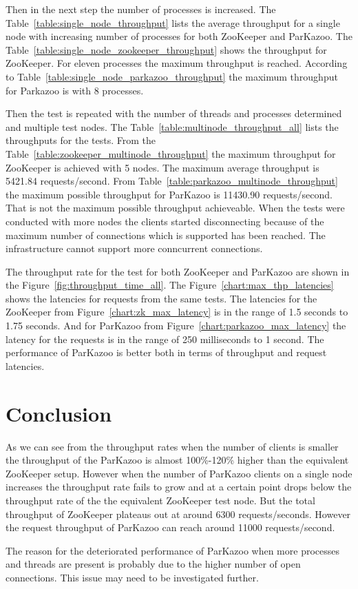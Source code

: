 

Then in the next step the number of processes is increased. The Table~\ref{table:single_node_throughput} lists the average throughput for a single node with increasing number of processes for both ZooKeeper and ParKazoo. The Table~\ref{table:single_node_zookeeper_throughput} shows the throughput for ZooKeeper. For eleven processes the maximum throughput is reached. According to Table~\ref{table:single_node_parkazoo_throughput} the maximum throughput for Parkazoo is with 8 processes.

Then the test is repeated with the number of threads and processes determined and multiple test nodes. The Table~\ref{table:multinode_throughput_all} lists the throughputs for the tests. From the Table~\ref{table:zookeeper_multinode_throughput} the maximum throughput for ZooKeeper is achieved with 5 nodes. The maximum average throughput is 5421.84 requests/second. From Table~\ref{table:parkazoo_multinode_throughput} the maximum possible throughput for ParKazoo is 11430.90 requests/second. That is not the maximum possible throughput achieveable. When the tests were conducted with more nodes the clients started disconnecting because of the maximum number of connections which is supported has been reached. The infrastructure cannot support more conncurrent connections.



The throughput rate for the test for both ZooKeeper and ParKazoo are shown in the Figure~\ref{fig:throughput_time_all}. The Figure~\ref{chart:max_thp_latencies} shows the latencies for requests from the same tests. The latencies for the ZooKeeper from Figure~\ref{chart:zk_max_latency} is in the range of 1.5 seconds to 1.75 seconds. And for ParKazoo from Figure~\ref{chart:parkazoo_max_latency} the latency for the requests is in the range of 250 milliseconds to 1 second. The performance of ParKazoo is better both in terms of throughput and request latencies.




\section{Conclusion}
As we can see from the throughput rates when the number of clients is smaller the throughput of the ParKazoo is almost 100\%-120\% higher than the equivalent ZooKeeper setup. However when the number of ParKazoo clients on a single node increases the throughput rate fails to grow and at a certain point drops below the throughput rate of the the equivalent ZooKeeper test node. But the total throughput of ZooKeeper plateaus out at around 6300 requests/seconds. However the request throughput of ParKazoo can reach around 11000 requests/second.

The reason for the deteriorated performance of ParKazoo when more processes and threads are present is probably due to the higher number of open connections. This issue may need to be investigated further. 

